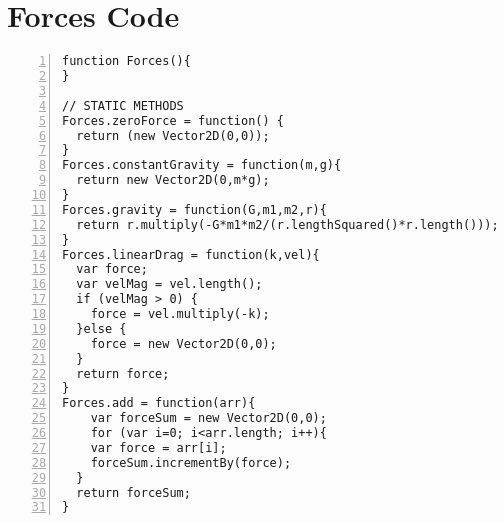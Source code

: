 \section{Forces Code}
\begin{lstlisting}[breaklines=true, frame=single, numbers=left, caption=Code used involving forces]
function Forces(){
}

// STATIC METHODS
Forces.zeroForce = function() {
  return (new Vector2D(0,0));
}
Forces.constantGravity = function(m,g){
  return new Vector2D(0,m*g);
}
Forces.gravity = function(G,m1,m2,r){
  return r.multiply(-G*m1*m2/(r.lengthSquared()*r.length()));
}
Forces.linearDrag = function(k,vel){
  var force;
  var velMag = vel.length();
  if (velMag > 0) {
    force = vel.multiply(-k);
  }else {
    force = new Vector2D(0,0);
  }
  return force;
}
Forces.add = function(arr){
    var forceSum = new Vector2D(0,0);
    for (var i=0; i<arr.length; i++){
    var force = arr[i];
    forceSum.incrementBy(force);
  }
  return forceSum;
}
\end{lstlisting}









